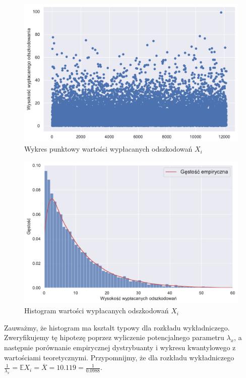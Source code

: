\documentclass[12pt]{mwart}
\begin{document}
	
	\begin{figure}[H]
	\begin{center}
		\includegraphics[scale=0.5]{scatter1.pdf}
		\caption{Wykres punktowy wartości wypłacanych odszkodowań $X_i$}
	\end{center}
	\end{figure}
	
	\begin{figure}[H]
	\begin{center}
		\includegraphics[scale=0.5]{histogram1.pdf}
		\caption{Histogram wartości wypłacanych odszkodowań $X_i$}
	\end{center}
	\end{figure}
	
	\noindent Zauważmy, że histogram ma kształt typowy dla rozkładu wykładniczego. Zweryfikujemy tę hipotezę poprzez wyliczenie potencjalnego parametru $\lambda_{x}$, a następnie porównanie empirycznej dystrybuanty i wykresu kwantylowego z wartościami teoretycznymi. Przypomnijmy, że dla rozkładu wykładniczego $\frac{1}{\lambda_{x}}=\mathbb{E} X_i = \overline{X} = 10.119 = \frac{1}{0.0988}$.
	
\end{document}
